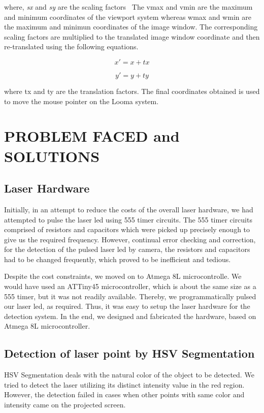\documentclass[12pt, a4paper]{article}
\begin{document}
where, \emph{sx} and \emph{sy} are the scaling factors~\cite{hen}
The vmax and vmin are the maximum and minimum coordinates of the viewport system whereas wmax and wmin are the maximum and minimun coordinates of the image window. 
The corresponding scaling factors are multiplied to the translated image window coordinate and then re-translated using the following equations. 

\begin{equation}
x' = x + tx
\end{equation}

\begin{equation}
y' = y + ty
\end{equation}

where tx and ty are the translation factors. The final coordinates obtained is used to move the mouse pointer on the Looma system. 
\newpage
\section{PROBLEM FACED and SOLUTIONS}
\subsection{Laser Hardware}
Initially, in an attempt to reduce the costs of the overall laser hardware, we had attempted to pulse the laser led using 555 timer circuits. The 555 timer circuits comprised of resistors and capacitors which were picked up precisely enough to give us the required frequency. However, continual error checking and correction, for the detection of the pulsed laser led by camera, the resistors and capacitors had to be changed frequently, which proved to be inefficient and tedious.

Despite the cost constraints, we moved on to Atmega 8L microcontrolle. We would have used an ATTiny45 microcontroller, which is about the same size as a 555 timer, but it was not readily available. Thereby, we programmatically pulsed our laser led, as required. Thus, it was easy to setup the laser hardware for the detection system. In the end, we designed and fabricated the hardware, based on Atmega 8L microcontroller. 


\subsection{Detection of laser point by HSV Segmentation}

HSV Segmentation deals with the natural color of the object to be detected. We tried to detect the laser utilizing its distinct intensity value in the red region. However, the detection failed in cases when other points with same color and intensity came on the projected screen.
\end{document}
